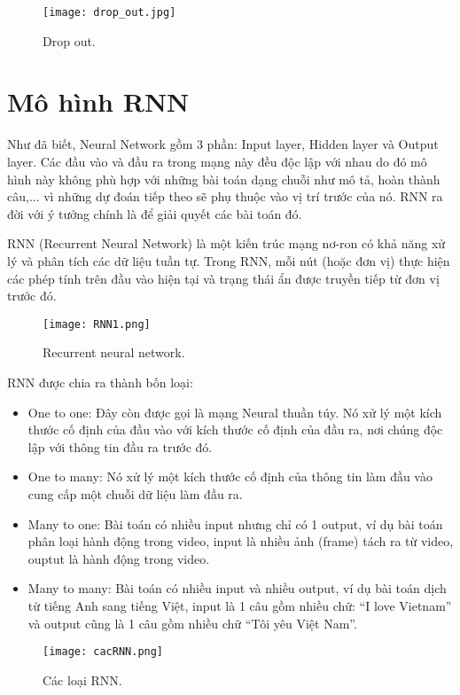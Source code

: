 \begin{figure}[h!]
	\centering
	\texttt{[image: drop\_out.jpg]}
	\caption{Drop out.}
\end{figure} 

\newpage
\section{Mô hình RNN}
Như đã biết, Neural Network gồm 3 phần: Input layer, Hidden layer và Output layer. Các đầu vào và đầu ra trong mạng này đều độc lập với nhau do đó mô hình này không phù hợp với những bài toán dạng chuỗi như mô tả, hoàn thành câu,... vì những dự đoán tiếp theo sẽ phụ thuộc vào vị trí trước của nó. RNN ra đời với ý tưởng chính là để giải quyết các bài toán đó.

RNN (Recurrent Neural Network) là một kiến trúc mạng nơ-ron có khả năng xử lý và phân tích các dữ liệu tuần tự. Trong RNN, mỗi nút (hoặc đơn vị) thực hiện các phép tính trên đầu vào hiện tại và trạng thái ẩn được truyền tiếp từ đơn vị trước đó.

\begin{figure}[h!]
	\centering
	\texttt{[image: RNN1.png]}
	\caption{Recurrent neural network.}
\end{figure} 

RNN được chia ra thành bốn loại:
\begin{itemize}
	\item One to one:
	Đây còn được gọi là mạng Neural thuần túy. Nó xử lý một kích thước cố định của đầu vào với kích thước cố định của đầu ra, nơi chúng độc lập với thông tin đầu ra trước đó. 
	\item One to many:
	Nó xử lý một kích thước cố định của thông tin làm đầu vào cung cấp một chuỗi dữ liệu làm đầu ra.
	\item Many to one:
	Bài toán có nhiều input nhưng chỉ có 1 output, ví dụ bài toán phân loại hành động trong video, input là nhiều ảnh (frame) tách ra từ video, ouptut là hành động trong video.
	\item Many to many:
	Bài toán có nhiều input và nhiều output, ví dụ bài toán dịch từ tiếng Anh sang tiếng Việt, input là 1 câu gồm nhiều chữ: “I love Vietnam” và output cũng là 1 câu gồm nhiều chữ “Tôi yêu Việt Nam”.
\end{itemize}

\begin{figure}[h!]
	\centering
	\texttt{[image: cacRNN.png]}
	\caption{Các loại RNN.}
\end{figure} 


